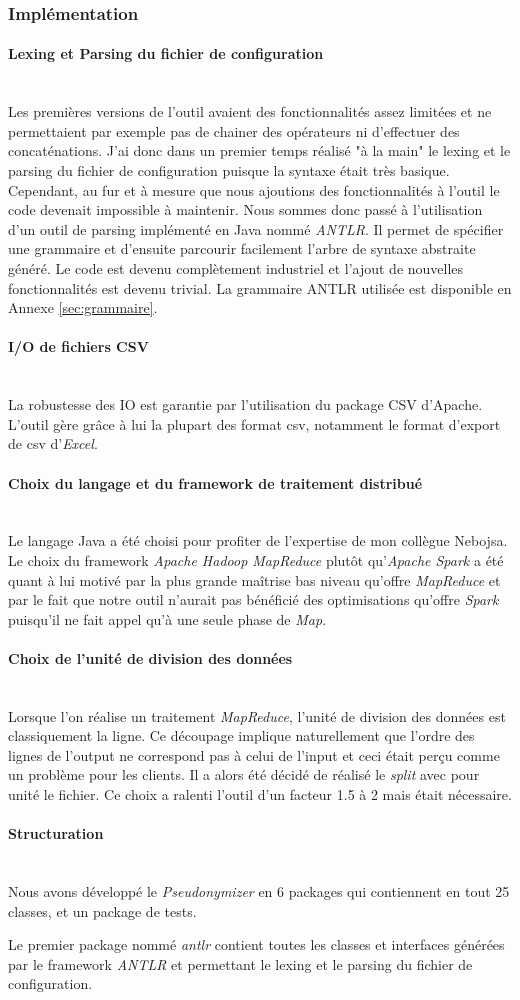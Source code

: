 \documentclass[12pt]{report}
\newcommand{\namedparagraph}[1]{\paragraph*{#1}\mbox{}\\}
\begin{document}
	\subsubsection{Implémentation}
	\namedparagraph{Lexing et Parsing du fichier de configuration}
	Les premières versions de l'outil avaient des fonctionnalités assez limitées et ne permettaient par exemple pas de chainer des opérateurs ni d'effectuer des concaténations. J'ai donc dans un premier temps réalisé "à la main" le lexing et le parsing du fichier de configuration puisque la syntaxe était très basique. Cependant, au fur et à mesure que nous ajoutions des fonctionnalités à l'outil le code devenait impossible à maintenir. Nous sommes donc passé à l'utilisation d'un outil de parsing implémenté en Java nommé \textit{ANTLR}. Il permet de spécifier une grammaire et d'ensuite parcourir facilement l'arbre de syntaxe abstraite généré. Le code est devenu complètement industriel et l'ajout de nouvelles fonctionnalités est devenu trivial. La grammaire ANTLR utilisée est disponible en Annexe \ref{sec:grammaire}.
	\namedparagraph{I/O de fichiers CSV}
	La robustesse des IO est garantie par l'utilisation du package CSV d'Apache. L'outil gère grâce à lui la plupart des format csv, notamment le format d'export de csv d'\textit{Excel}. 
	\namedparagraph{Choix du langage et du framework de traitement distribué}
	Le langage Java a été choisi pour profiter de l'expertise de mon collègue Nebojsa. Le choix du framework \textit{Apache Hadoop MapReduce} plutôt qu'\textit{Apache Spark} a été quant à lui motivé par la plus grande maîtrise bas niveau qu'offre \textit{MapReduce} et par le fait que notre outil n'aurait pas bénéficié des optimisations qu'offre \textit{Spark} puisqu'il ne fait appel qu'à une seule phase de \textit{Map}.
	\namedparagraph{Choix de l'unité de division des données}
	Lorsque l'on réalise un traitement \textit{MapReduce}, l'unité de division des données est classiquement la ligne. Ce découpage implique naturellement que l'ordre des lignes de l'output ne correspond pas à celui de l'input et ceci était perçu comme un problème pour les clients. Il a alors été décidé de réalisé le \textit{split} avec pour unité le fichier. Ce choix a ralenti l'outil d'un facteur 1.5 à 2 mais était nécessaire.
	\newpage %
	\namedparagraph{Structuration}
	Nous avons développé le \textit{Pseudonymizer} en 6 packages qui contiennent en tout 25 classes, et un package de tests. 
	
	Le premier package nommé \textit{antlr} contient toutes les classes et interfaces générées par le framework \textit{ANTLR} et permettant le lexing et le parsing du fichier de configuration.
	
\end{document}
